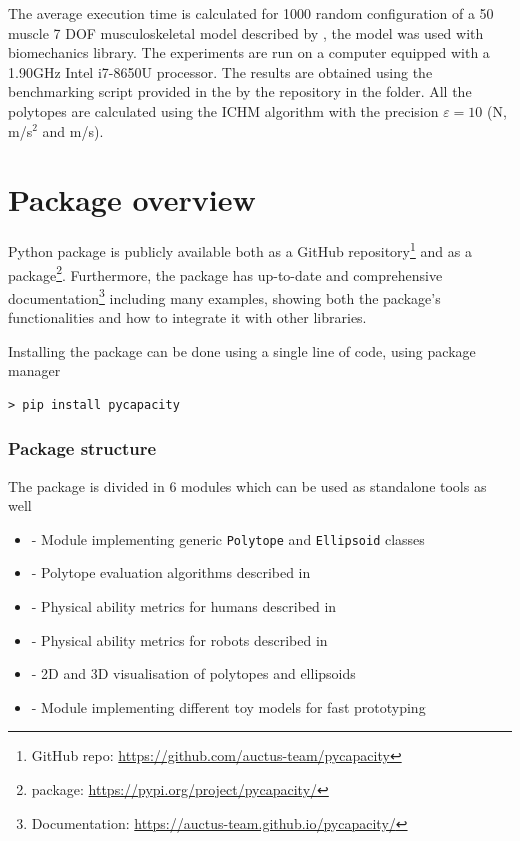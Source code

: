 The average execution time is calculated for 1000 random configuration of a 50 muscle 7 DOF musculoskeletal model described by \citet{holzbaur2005model}, the model was used with  \cite{Michaud2021} biomechanics library. The experiments are run on a computer equipped with a 1.90GHz Intel i7-8650U processor. The results are obtained using the benchmarking script provided in the by the repository in the  folder. All the polytopes are calculated using the ICHM algorithm with the precision $\varepsilon=10$ (N, m/s$^2$ and m/s).

\section{Package overview}
\label{sec:pycapacity_package_overview}
Python package  is publicly available both as a GitHub repository\footnote{GitHub repo: \url{https://github.com/auctus-team/pycapacity}} and as a  package\footnote{ package: \url{https://pypi.org/project/pycapacity/}}. Furthermore, the package has up-to-date and comprehensive documentation\footnote{Documentation: \url{https://auctus-team.github.io/pycapacity/}} including many examples, showing both the package's functionalities and how to integrate it with other libraries. 

Installing the package can be done using a single line of code, using  package manager 
\begin{verbatim}
> pip install pycapacity
\end{verbatim}

\subsubsection*{Package structure}
The package is divided in 6 modules which can be used as standalone tools as well
\begin{itemize}
    \item {} - Module implementing generic \texttt{Polytope} and \texttt{Ellipsoid} classes 
    \item {} - Polytope evaluation algorithms described in  
    \item {} - Physical ability metrics for humans described in 
    \item {} - Physical ability metrics for robots described in 
    \item {} - 2D and 3D visualisation of polytopes and ellipsoids
    \item {} - Module implementing different toy models for fast prototyping
\end{itemize}



